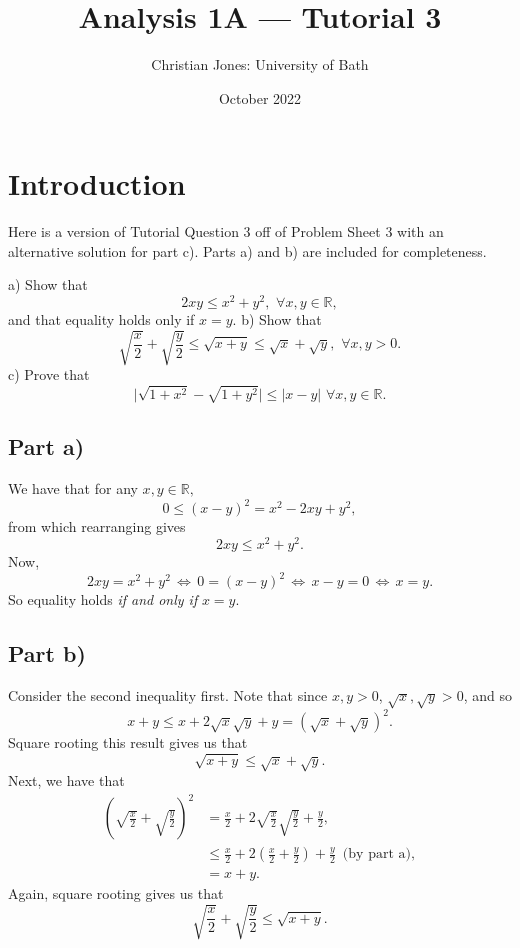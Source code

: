 \documentclass[
  12pt,
  a4paper]{extarticle}
\title{Analysis 1A --- Tutorial 3}
\author{Christian Jones: University of Bath}
\date{October 2022}
\theoremstyle{plain}
\theoremstyle{definition}
\theoremstyle{plain}
\theoremstyle{plain}
\theoremstyle{plain}
\theoremstyle{plain}
\theoremstyle{definition}
\theoremstyle{definition}
\theoremstyle{remark}
\theoremstyle{remark}
\let\BeginKnitrBlock\begin \let\EndKnitrBlock\end
\renewcommand{\;}{\,}
\begin{document}
\maketitle

{
\setcounter{tocdepth}{2}
\tableofcontents
}
\newpage
{}

\hypertarget{introduction}{%
\section*{Introduction}\label{introduction}}

Here is a version of Tutorial Question 3 off of Problem Sheet 3 with an alternative solution for part c). Parts a) and b) are included for completeness.

\BeginKnitrBlock{example}[PS3 Question 3]
{\label{exm:ex1} }a) Show that \[ 2xy \leq x^2 + y^2, \;\; \forall x,y \in \mathbb{R},\] and that equality holds only if \(x = y\).
b) Show that \[\sqrt{\frac{x}{2}} + \sqrt{\frac{y}{2}} \leq \sqrt{x + y} \leq \sqrt{x} + \sqrt{y}, \;\; \forall x,y > 0.\]
c) Prove that \[\lvert \sqrt{1 + x^2} - \sqrt{1 + y^2} \rvert \leq \lvert x - y \rvert \;\; \forall x,y \in \mathbb{R}.\]
\EndKnitrBlock{example}

\hypertarget{part-a}{%
\subsection*{Part a)}\label{part-a}}

\BeginKnitrBlock{solution*}
We have that for any \(x,y\in\mathbb{R},\) \[ 0 \leq (x-y)^2 = x^2 - 2xy + y^2,\] from which rearranging gives \[2xy \leq x^2 + y^2.\] Now, \[2xy = x^2 + y^2\; \Leftrightarrow\; 0 = (x-y)^2 \;\Leftrightarrow \;x-y = 0 \;\Leftrightarrow\; x=y.\] So equality holds \emph{if and only if} \(x = y.\)
\EndKnitrBlock{solution*}

\hypertarget{part-b}{%
\subsection*{Part b)}\label{part-b}}

\BeginKnitrBlock{solution*}
Consider the second inequality first. Note that since \(x,y > 0\), \(\sqrt{x}, \sqrt{y} > 0\), and so \[x + y \leq x + 2\sqrt{x}\sqrt{y} + y = (\sqrt{x} + \sqrt{y})^2.\] Square rooting this result gives us that \[\sqrt{x + y} \leq \sqrt{x} + \sqrt{y}.\] Next, we have that
\begin{align*}
\left(\sqrt{\frac{x}{2}} + \sqrt{\frac{y}{2}}\right)^2 &= \frac{x}{2} + 2\sqrt{\frac{x}{2}}\sqrt{\frac{y}{2}} + \frac{y}{2},\\
&\leq \frac{x}{2} + 2\left(\frac{x}{2} + \frac{y}{2}\right) + \frac{y}{2} \;\;\; \text{(by part a)},\\
&= x + y.
\end{align*}
Again, square rooting gives us that \[\sqrt{\frac{x}{2}} + \sqrt{\frac{y}{2}} \leq \sqrt{x + y}.\]
\EndKnitrBlock{solution*}
\end{document}
